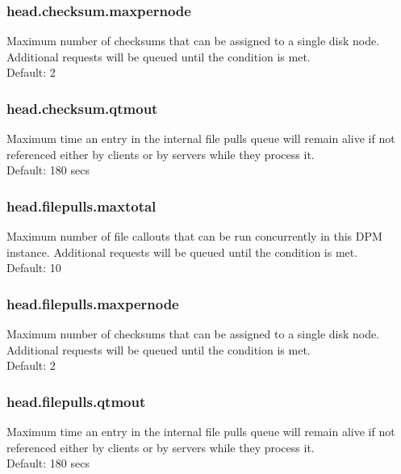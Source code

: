 \documentclass[a4paper,10pt]{scrreprt}
\begin{document}
\subsubsection{head.checksum.maxpernode}

Maximum number of checksums that can be assigned to a single disk node. Additional requests will be queued until the condition is met.\\
Default: 2\\


\subsubsection{head.checksum.qtmout}

Maximum time an entry in the internal file pulls queue will remain alive if not referenced either by clients or by servers while they process it.\\
Default: 180 secs\\




\subsubsection{head.filepulls.maxtotal}

Maximum number of file callouts that can be run concurrently in this DPM instance. Additional requests will be queued until the condition is met.\\
Default: 10\\

\subsubsection{head.filepulls.maxpernode}

Maximum number of checksums that can be assigned to a single disk node. Additional requests will be queued until the condition is met.\\
Default: 2\\


\subsubsection{head.filepulls.qtmout}

Maximum time an entry in the internal file pulls queue will remain alive if not referenced either by clients or by servers while they process it.\\
Default: 180 secs\\
\end{document}
